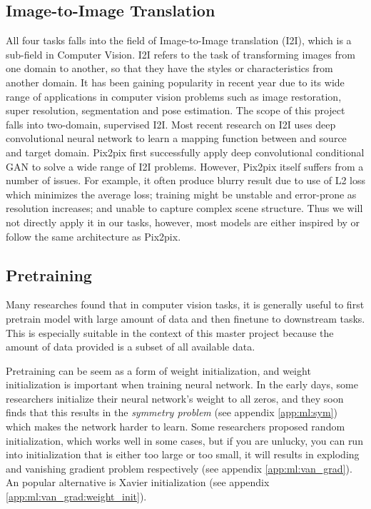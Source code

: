 \subsection{Image-to-Image Translation}
All four tasks falls into the field of Image-to-Image translation (I2I), which is a sub-field in Computer Vision. I2I refers to the task of transforming images from one domain to another, so that they have the styles or characteristics from another domain. It has been gaining popularity in recent year due to its wide range of applications in computer vision problems such as image restoration, super resolution, segmentation and pose estimation. The scope of this project falls into two-domain, supervised I2I\cite{pangImagetoImageTranslationMethods2021}. Most recent research on I2I uses deep convolutional neural network to learn a mapping function between and source and target domain. Pix2pix\cite{isolaImagetoImageTranslationConditional2018} first successfully apply deep convolutional conditional GAN to solve a wide range of I2I problems. However, Pix2pix itself suffers from a number of issues. For example, it often produce blurry result due to use of L2 loss which minimizes the average loss\cite{wangDiscriminativeRegionProposal2018}; training might be unstable and error-prone as resolution increases\cite{wangHighResolutionImageSynthesis2018}; and unable to capture complex scene structure\cite{tangMultiChannelAttentionSelection2019}. Thus we will not directly apply it in our tasks, however, most models are either inspired by or follow the same architecture as Pix2pix.

\subsection{Pretraining}
Many researches found that in computer vision tasks, it is generally useful to first pretrain model with large amount of data and then finetune to downstream tasks\cite{baoBEiTBERTPreTraining2021, weiMaskedFeaturePrediction2021, newellHowUsefulSelfSupervised2020}. This is especially suitable in the context of this master project because the amount of data provided is a subset of all available data\cite{newellHowUsefulSelfSupervised2020}.

Pretraining can be seem as a form of weight initialization, and weight initialization is important when training neural network. In the early days, some researchers initialize their neural network's weight to all zeros, and they soon finds that this results in the \textit{symmetry problem} (see appendix \ref{app:ml:sym}) which makes the network harder to learn. Some researchers proposed random initialization, which works well in some cases, but if you are unlucky, you can run into initialization that is either too large or too small, it will results in exploding and vanishing gradient problem respectively (see appendix \ref{app:ml:van_grad}). An popular alternative is Xavier initialization\cite{glorotUnderstandingDifficultyTraining2010} (see appendix \ref{app:ml:van_grad:weight_init}).


